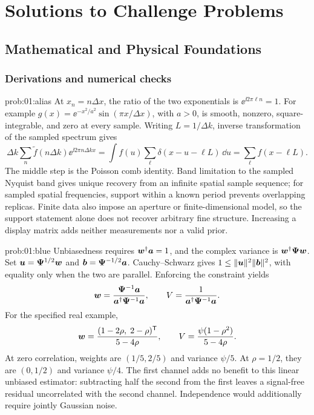 \chapter{Solutions to Challenge Problems}
\label{app:e}
\section{Mathematical and Physical Foundations}
\label{sec:e:mathematical-and-physical-foundations}
\subsection{Derivations and numerical checks}
\begin{solution}{prob:01:alias}
At \(x_n=n\Delta x\), the ratio of the two exponentials is
\(\ee^{\ii2\pi\ell n}=1\). For example
\(g(x)=\ee^{-x^2/a^2}\sin(\pi x/\Delta x)\), with \(a>0\), is smooth, nonzero, square-integrable, and zero at every sample.
Writing \(L=1/\Delta k\), inverse transformation of the sampled spectrum gives
\[
 \Delta k\sum_n\widetilde f(n\Delta k)\ee^{\ii2\pi n\Delta k x}
 =\int f(u)\sum_\ell\delta(x-u-\ell L)\,\dd u
 =\sum_\ell f(x-\ell L).
\]
The middle step is the Poisson comb identity. Band limitation to the sampled Nyquist band gives unique recovery from an infinite spatial sample sequence; for sampled spatial frequencies, support within a known period prevents overlapping replicas. Finite data also impose an aperture or finite-dimensional model, so the support statement alone does not recover arbitrary fine structure. Increasing a display matrix adds neither measurements nor a valid prior.
\end{solution}
\begin{solution}{prob:01:blue}
Unbiasedness requires \(\bm{w}^\dagger\bm{a}=1\), and the complex variance is \(\bm{w}^\dagger\mathbf{\Psi}\bm{w}\).
Set \(\bm{u}=\mathbf{\Psi}^{1/2}\bm{w}\) and \(\bm{b}=\mathbf{\Psi}^{-1/2}\bm{a}\).
Cauchy--Schwarz gives \(1\leq\lVert\bm{u}\rVert^2\lVert\bm{b}\rVert^2\), with equality only when the two are parallel. Enforcing the constraint yields
\[
 \bm{w}=\frac{\mathbf{\Psi}^{-1}\bm{a}}{\bm{a}^\dagger\mathbf{\Psi}^{-1}\bm{a}},
 \qquad V=\frac1{\bm{a}^\dagger\mathbf{\Psi}^{-1}\bm{a}}.
\]
For the specified real example,
\[
 \bm{w}=\frac{(1-2\rho,\;2-\rho)^{\mathsf T}}{5-4\rho},
 \qquad V=\frac{\psi(1-\rho^2)}{5-4\rho}.
\]
At zero correlation, weights are \((1/5,2/5)\) and variance \(\psi/5\).
At \(\rho=1/2\), they are \((0,1/2)\) and variance \(\psi/4\).
The first channel adds no benefit to this linear unbiased estimator: subtracting half the second from the first leaves a signal-free residual uncorrelated with the second channel. Independence would additionally require jointly Gaussian noise.
\end{solution}
